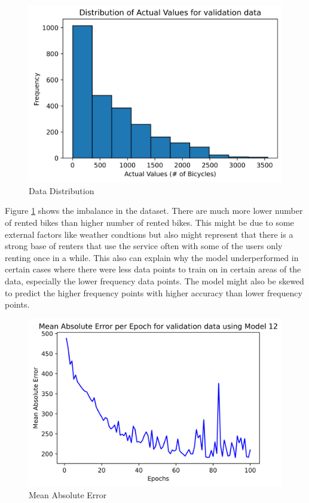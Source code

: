 \documentclass{article}
\begin{document}
    \begin{figure}[H]
        \includegraphics[width=\linewidth]{images/histo.png}
        \caption{Data Distribution}
        \label{fig:histo}
    \end{figure}
    Figure \ref{fig:histo} shows the imbalance in the dataset. There are much more lower number of rented bikes than higher number of rented bikes.
    This might be due to some external factors like weather condtions but also might represent that there is a strong base of 
    renters that use the service often with some of the users only renting once in a while. This also can explain why the model underperformed 
    in certain cases where there were less data points to train on in certain areas of the data, especially the lower frequency data points. 
    The model might also be skewed to predict the higher frequency points with higher accuracy than lower frequency points.

    \begin{figure}[H]
        \includegraphics[width=\linewidth]{images/mae.png}
        \caption{Mean Absolute Error}
        \label{fig:mae}
    \end{figure}
\end{document}
